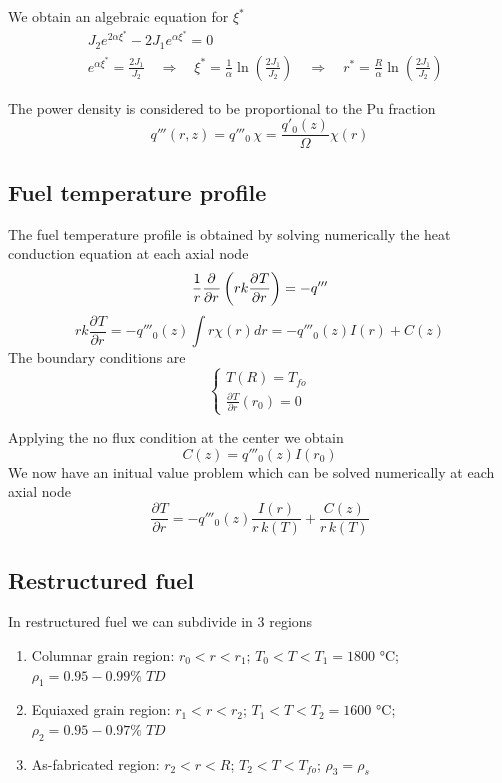 \documentclass{article}
\newcommand{\pderiv}[3][]{\frac{\partial^{#1} #2}{\partial #3^{#1}}}
\begin{document}
We obtain an algebraic equation for \(\xi^*\)
\begin{align*}
  & J_2e^{2\alpha\xi^*} - 2J_1e^{\alpha\xi^*} = 0\\
  & e^{\alpha\xi^*} = \frac{2J_1}{J_2}  \quad \Rightarrow \quad \xi^* = \frac{1}{\alpha}\ln\left(\frac{2J_1}{J_2}\right) \quad \Rightarrow \quad r^* = \frac{R}{\alpha}\ln\left(\frac{2J_1}{J_2}\right)
\end{align*}

The power density is considered to be proportional to the Pu fraction
\[
  q'''(r,z) = q'''_0\, \chi  = \frac{ q'_0(z) }{\Omega}\chi(r)
\]

\subsection{Fuel temperature profile}
The fuel temperature profile is obtained by solving numerically the heat conduction equation at each axial node
\[
   \frac{1}{r}\pderiv{}{r}\left(r k \pderiv{T}{r}\right) = -q'''\\
\]
\[
  rk\pderiv{T}{r} = -q'''_0(z)\int r\chi(r)dr = -q'''_0(z)I(r) + C(z)
\]
The boundary conditions are
\[
  \begin{cases}
    T(R) = T_{fo} \\
    \pderiv{T}{r}(r_0) = 0
  \end{cases}
\]

Applying the no flux condition at the center we obtain
\[
  C(z) = q'''_0(z)I(r_0)
\]
We now have an initual value problem which can be solved numerically at each axial node
\begin{equation}
  \pderiv{T}{r} = -q'''_0(z)\frac{I(r)}{r\,k(T)} + \frac{C(z)}{r\,k(T)}
  \label{eq:IVP_fuel_T}
\end{equation}

\subsection{Restructured fuel}
In restructured fuel we can subdivide in 3 regions
\begin{enumerate}
  \item Columnar grain region: \(r_0 < r < r_1\);  \(T_0 < T < T_1 = 1800\) °C;  \(\rho_1 = 0.95 - 0.99\%\; TD\)\\
  \item Equiaxed grain region: \(r_1 < r < r_2\);  \(T_1 < T < T_2 = 1600\) °C;  \(\rho_2 = 0.95 - 0.97\%\; TD\)\\
  \item As-fabricated region: \(r_2 < r < R\);  \(T_2 < T < T_{fo}\);  \(\rho_3 = \rho_s\)\\
\end{enumerate}
\end{document}

